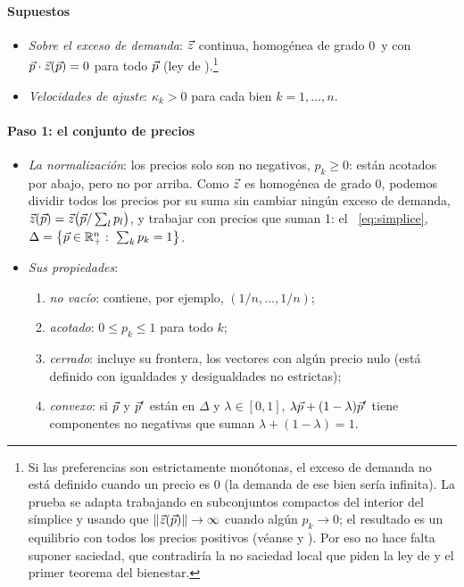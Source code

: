 \documentclass[11pt]{article}
\begin{document}
\paragraph{Supuestos}

\begin{itemize}
\item \emph{Sobre el exceso de demanda}: $\vec{z}$ continua, homogénea de grado 0~y con $\vec{p}\cdot\vec{z}(\vec{p})=0$ para todo $\vec{p}$ (ley de ).\footnote{Si las preferencias son estrictamente monótonas, el exceso de demanda no está definido cuando un precio es 0 (la demanda de ese bien sería infinita). La prueba se adapta trabajando en subconjuntos compactos del interior del símplice y usando que $\lVert\vec{z}(\vec{p})\rVert\to\infty$ cuando algún $p_k\to 0$; el resultado es un equilibrio con todos los precios positivos (véanse \textcite[§17.C]{MasColellWhinstonGreen1995} y \textcite[teorema~5.3]{JehleReny2011Advanced}). Por eso no hace falta suponer saciedad, que contradiría la no saciedad local que piden la ley de  y el primer teorema del bienestar.}
\item \emph{Velocidades de ajuste}: $\kappa_k>0$ para cada bien $k=1,\dots,n$.
\end{itemize}

\paragraph{Paso 1: el conjunto de precios}

\begin{itemize}
\item \emph{La normalización}: los precios solo son no negativos, $p_k\geq 0$: están acotados por abajo, pero no por arriba. Como $\vec{z}$ es homogénea de grado 0, podemos dividir todos los precios por su suma sin cambiar ningún exceso de demanda, $\vec{z}(\vec{p})=\vec{z}\big(\vec{p}/\sum_lp_l\big)$, y trabajar con precios que suman 1: el ~\eqref{eq:simplice}, $\Delta=\big\{\vect{p}\in\mathbb{R}^n_+:\ \sum_kp_k=1\big\}$.
\item \emph{Sus propiedades}:
  \begin{enumerate}
  \item \emph{no vacío}: contiene, por ejemplo, $(1/n,\dots,1/n)$;
  \item \emph{acotado}: $0\leq p_k\leq 1$ para todo $k$;
  \item \emph{cerrado}: incluye su frontera, los vectores con algún precio nulo (está definido con igualdades y desigualdades no estrictas);
  \item \emph{convexo}: si $\vec{p}$ y $\vec{p}'$ están en $\Delta$ y $\lambda\in[0,1]$, $\lambda\vec{p}+(1-\lambda)\vec{p}'$ tiene componentes no negativas que suman $\lambda+(1-\lambda)=1$.
  \end{enumerate}
\end{itemize}
\end{document}
